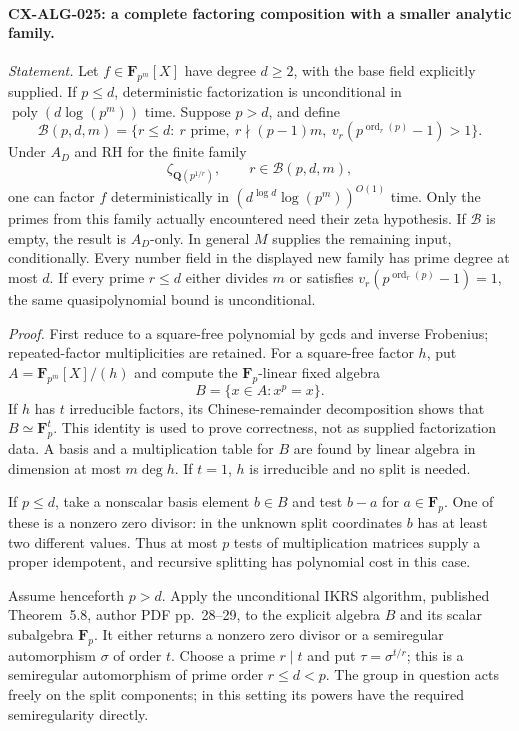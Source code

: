 \paragraph{CX-ALG-025: a complete factoring composition with a smaller analytic family.}
\emph{Statement.} Let $f\in\mathbf F_{p^m}[X]$ have degree $d\ge2$,
with the base field explicitly supplied. If $p\le d$, deterministic
factorization is unconditional in $\operatorname{poly}(d\log(p^m))$
time. Suppose $p>d$, and define
\[
 \mathcal B(p,d,m)=\{r\le d:\ r\text{ prime},\ r\nmid(p-1)m,
                 \ v_r(p^{\operatorname{ord}_r(p)}-1)>1\}.
\]
Under $A_D$ and RH for the finite family
\[
             \zeta_{\mathbf Q(p^{1/r})},\qquad r\in\mathcal B(p,d,m),
\]
one can factor $f$ deterministically in
$(d^{\log d}\log(p^m))^{O(1)}$ time. Only the primes from this family
actually encountered need their zeta hypothesis. If $\mathcal B$ is
empty, the result is $A_D$-only. In general $M$ supplies the remaining
input, conditionally. Every number field in the displayed new family
has prime degree at most $d$. If every prime $r\le d$ either divides
$m$ or satisfies $v_r(p^{\operatorname{ord}_r(p)}-1)=1$, the same
quasipolynomial bound is unconditional.

\emph{Proof.} First reduce to a square-free polynomial by gcds and
inverse Frobenius; repeated-factor multiplicities are retained.
For a square-free factor $h$, put
$A=\mathbf F_{p^m}[X]/(h)$ and compute the $\mathbf F_p$-linear fixed
algebra
\[
                         B=\{x\in A:x^p=x\}.
\]
If $h$ has $t$ irreducible factors, its Chinese-remainder decomposition
shows that $B\simeq\mathbf F_p^t$. This identity is used to prove
correctness, not as supplied factorization data. A basis and a
multiplication table for $B$ are found by linear algebra in dimension
at most $m\deg h$. If $t=1$, $h$ is irreducible and no split is needed.

If $p\le d$, take a nonscalar basis element $b\in B$ and test
$b-a$ for $a\in\mathbf F_p$. One of these is a nonzero zero divisor:
in the unknown split coordinates $b$ has at least two different values.
Thus at most $p$ tests of multiplication matrices supply a proper
idempotent, and recursive splitting has polynomial cost in this case.

Assume henceforth $p>d$. Apply the unconditional IKRS algorithm,
published Theorem~5.8, author PDF pp.~28--29, to the explicit algebra
$B$ and its scalar subalgebra $\mathbf F_p$. It either returns a
nonzero zero divisor or a semiregular automorphism $\sigma$ of order
$t$. Choose a prime $r\mid t$ and put $\tau=\sigma^{t/r}$;
this is a semiregular automorphism of prime order $r\le d<p$.
The group in question acts freely on the split components; in this
setting its powers have the required semiregularity directly.

